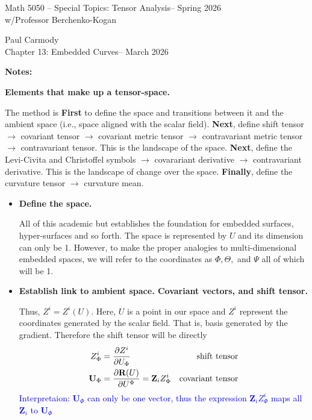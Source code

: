 \documentclass[12pt,a4paper]{report}
\newcommand{\CLASSNAME}{Math 5050 -- Special Topics: Tensor Analysis}
\newcommand{\STUDENTNAME}{Paul Carmody}
\newcommand{\ASSIGNMENT}{Chapter 13: Embedded Curves}
\newcommand{\DUEDATE}{March 2026}
\newcommand{\PROFESSOR}{Professor Berchenko-Kogan}
\newcommand{\SEMESTER}{Spring 2026}
\newcommand{\BLUE}[1]{\textcolor{blue}{#1}}
\begin{document}
\begin{center}
	\Large{\CLASSNAME -- \SEMESTER} \\
	\large{ w/\PROFESSOR}
\end{center}
\begin{center}
	\STUDENTNAME \\
	\ASSIGNMENT -- \DUEDATE\\
\end{center} 

\textbf{\Large{Notes:}}

\begin{description}
	\item \textbf{Elements that make up a tensor-space.}

	The method is \textbf{First} to define the space and transitions between it and the ambient space (i.e., space aligned with the scalar field).  \textbf{Next}, define shift tensor $\to$ covariant tensor $\to$ covariant metric tensor $\to$ contravariant metric tensor $\to$ contravariant tensor.  This is the landscape of the space.  \textbf{Next}, define the Levi-Civita and Christoffel symbols $\to$ covarariant derivative $\to$ contravariant derivative.  This is the landscape of change over the space.  \textbf{Finally}, define the curvature tensor $\to$ curvature mean.

	\begin{itemize}
		\item \textbf{Define the space.}  

All of this academic but establishes the foundation for embedded surfaces, hyper-surfaces and so forth.  The space is represented by $U$ and its dimension can only be 1.  However, to make the proper analogies to multi-dimensional embedded spaces, we will refer to the coordinates as $\Phi, \Theta,$ and $\Psi$ all of which will be 1.

		\item \textbf{Establish link to ambient space. Covariant vectors, and shift tensor.}

		Thus, $Z^i = Z^i(U)$.  Here, $U$ is a point in our space and $Z^i$ represent the coordinates generated by the scalar field.  That is, basis generated by the gradient.  Therefore the shift tensor will be directly
			\begin{align*}
				Z^i_\Phi &= \frac{\partial Z^i}{\partial U_\Phi} & \text{shift tensor} \\
				\textbf{U}_\Phi &= \frac{\partial \textbf{R}(U)}{\partial U^\Phi} = \textbf{Z}_iZ^i_\Phi & \text{covariant tensor} \\
			\end{align*}\BLUE{Interpretaion: $\textbf{U}_\Phi$ can only be one vector, thus the expression $\textbf{Z}_iZ^i_\Phi $ maps all $ \textbf{Z}_i$ to $\textbf{U}_\Phi$ }


\end{itemize}
\end{description}
\end{document}
